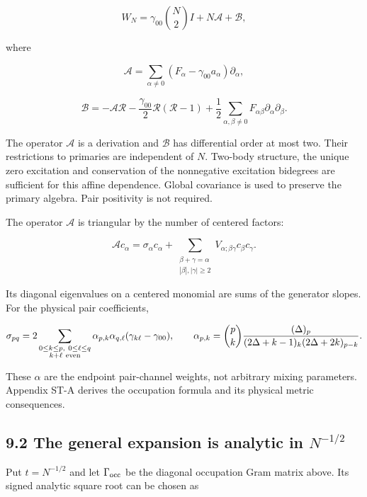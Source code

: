 \[
W_N=\gamma_{00}\binom N2 I+N\mathscr A+\mathscr B,
\]

where

\[
\mathscr A=\sum_{\alpha\ne0}(F_\alpha-\gamma_{00}a_\alpha)\partial_\alpha,
\]

\[
\mathscr B=-\mathscr A\mathcal R
-\frac{\gamma_{00}}2\mathcal R(\mathcal R-1)
+\frac12\sum_{\alpha,\beta\ne0}F_{\alpha\beta}\partial_\alpha\partial_\beta.
\]

The operator \(\mathscr A\) is a derivation and \(\mathscr B\) has differential order at most two. Their restrictions to primaries are independent of \(N\). Two-body structure, the unique zero excitation and conservation of the nonnegative excitation bidegrees are sufficient for this affine dependence. Global covariance is used to preserve the primary algebra. Pair positivity is not required.

The operator \(\mathscr A\) is triangular by the number of centered factors:

\[
\mathscr Ac_\alpha=\sigma_\alpha c_\alpha+
\sum_{\substack{\beta+\gamma=\alpha\\|\beta|,|\gamma|\geq2}}
V_{\alpha;\beta\gamma}c_\beta c_\gamma.
\]

Its diagonal eigenvalues on a centered monomial are sums of the generator slopes. For the physical pair coefficients,

\[
\sigma_{pq}=2\sum_{\substack{0\leq k\leq p,\ 0\leq\ell\leq q\\ k+\ell\ {\rm even}}}
\alpha_{p,k}\alpha_{q,\ell}(\gamma_{k\ell}-\gamma_{00}),
\qquad
\alpha_{p,k}=
\binom pk\frac{(\Delta)_p}
{(2\Delta+k-1)_k(2\Delta+2k)_{p-k}}.
\]

These \(\alpha\) are the endpoint pair-channel weights, not arbitrary mixing parameters. Appendix ST-A derives the occupation formula and its physical metric consequences.

\hypertarget{the-general-expansion-is-analytic-in-n-12}{%
\subsection{\texorpdfstring{9.2 The general expansion is analytic in \(N^{-1/2}\)}{9.2 The general expansion is analytic in N\^{}\{-1/2\}}}\label{the-general-expansion-is-analytic-in-n-12}}

Put \(t=N^{-1/2}\) and let \(\Gamma_{\rm occ}\) be the diagonal occupation Gram matrix above. Its signed analytic square root can be chosen as

